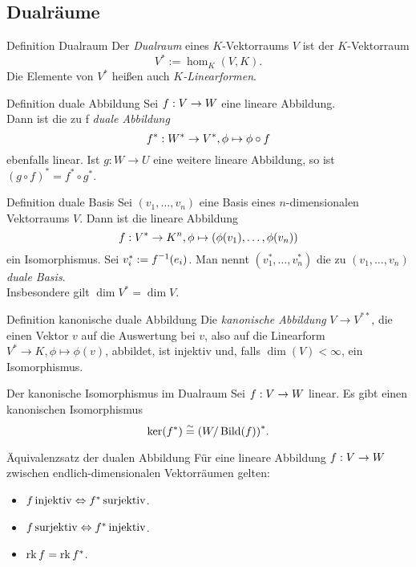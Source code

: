 \documentclass[main.tex]{subfiles}
\begin{document}
\subsection*{Dualräume}
\begin{karte}{Definition Dualraum}
    Der \textit{Dualraum} eines \(K\)-Vektorraums \(V\) ist der 
    \(K\)-Vektorraum 
    \[ V^* := \hom_K(V,K). \]
    Die Elemente von \(V^*\) heißen auch \textit{\(K\)-Linearformen}.
\end{karte}
\begin{karte}{Definition duale Abbildung}
    Sei \( f : V \rightarrow W \) eine lineare Abbildung.\\
    Dann ist die zu f \textit{duale Abbildung}
    \[ f^* : W^* \rightarrow V^*, \phi \mapsto \phi \circ f \]
    ebenfalls linear.
    Ist \(g: W \rightarrow U\) eine weitere lineare Abbildung,
    so ist \({(g \circ f)}^* = f^* \circ g^* \).    
\end{karte}
\begin{karte}{Definition duale Basis}
    Sei \( (v_1, \ldots, v_n) \) eine Basis eines 
    \(n\)-dimensionalen Vektorraums \(V\). Dann ist 
    die lineare Abbildung 
    \[ f : V^* \rightarrow K^n, 
    \phi \mapsto (\phi(v_1), \ldots, \phi(v_n)) \]
    ein Isomorphismus. Sei \( v_i^* := \inverse{f}(e_i) \). 
    Man nennt \( (v_1^*, \ldots, v_n^*) \) die zu 
    \( (v_1, \ldots, v_n) \) \textit{duale Basis}.\\
    Insbesondere gilt \( \dim V^* = \dim V \).
\end{karte}
\begin{karte}{Definition kanonische duale Abbildung}
    Die \textit{kanonische Abbildung} \( V \rightarrow V^{**} \),
    die einen Vektor \(v\) auf die Auswertung bei \(v\), also auf die 
    Linearform \( V^* \rightarrow K, \phi \mapsto \phi(v)\), abbildet,
    ist injektiv und, falls \(\dim(V) < \infty \), ein Isomorphismus.
\end{karte}
\begin{karte}{Der kanonische Isomorphismus im Dualraum}
    Sei \( f : V \rightarrow W \) linear. Es gibt einen kanonischen 
    Isomorphismus 
    \[ \ker(f^*) \overset{\sim}{=} {(W/\operatorname{Bild}(f))}^*. \]
\end{karte}
\begin{karte}{Äquivalenzsatz der dualen Abbildung}
    Für eine lineare Abbildung \( f : V \rightarrow W \) 
    zwischen endlich-dimensionalen Vektorräumen gelten:
    \begin{itemize}
        \item \( f \operatorname{injektiv} \Leftrightarrow f^* \operatorname{surjektiv} \).
        \item \( f \operatorname{surjektiv} \Leftrightarrow f^* \operatorname{injektiv} \).
        \item \( \operatorname{rk} f = \operatorname{rk} f^* \).
    \end{itemize}
\end{karte}
\end{document}
